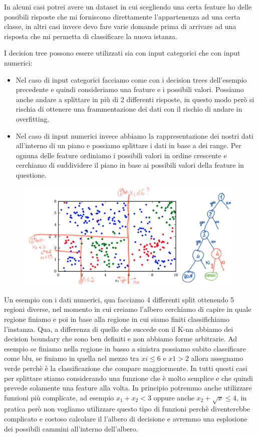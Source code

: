 \documentclass[14pt]{extreport}
\begin{document}
In alcuni casi potrei avere un dataset in cui scegliendo una certa feature ho delle possibili risposte che mi forniscono direttamente l’appartenenza
ad una certa classe, in altri casi invece devo fare varie domande prima di arrivare ad una risposta che mi permetta di classificare la nuova istanza.

I decision tree possono essere utilizzati sia con input categorici che con input numerici:

\begin{itemize}
	\item Nel caso di input categorici facciamo come con i decision trees dell’esempio precedente e quindi consideriamo una feature e i possibili
	valori. Possiamo anche andare a splittare in più di 2 differenti risposte, in questo modo però si rischia di ottenere una frammentazione dei dati
	con il rischio di andare in overfitting.
	\item Nel caso di input numerici invece abbiamo la rappresentazione dei nostri dati all’interno di un piano e possiamo splittare i dati in base a
	dei range. Per ognuna delle feature ordiniamo i possibili valori in ordine crescente e cerchiamo di suddividere il piano in base ai possibili
	valori della feature in questione.
\end{itemize}


\begin{figure}[H]
	\centering
	\includegraphics[width=0.7\linewidth]{479.jpeg}
\end{figure}

Un esempio con i dati numerici, qua facciamo 4 differenti split ottenendo 5 regioni diverse, nel momento in cui creiamo l’albero cerchiamo di capire
in quale regione finiamo e poi in base alla regione in cui siamo finiti classifichiamo l’instanza. Qua, a differenza di quello che succede con il K-nn
abbiamo dei decision boundary che sono ben definiti e non abbiamo forme arbitrarie. Ad esempio se finiamo nella regione in basso a sinistra possiamo
subito classificare come blu, se finiamo in quella nel mezzo tra $xi \leq 6$ e $x1>2$ allora assegnamo verde perchè è la classificazione che compare
maggiormente. In tutti questi casi per splittare stiamo considerando una funzione che è molto semplice e che quindi prevede solamente una feature alla
volta. In principio potremmo anche utilizzare funzioni più complicate, ad esempio $x_1+x_2 < 3$ oppure anche $x_2 +\sqrt{x} \leq 4$, in pratica però
non vogliamo utilizzare questo tipo di funzioni perchè diventerebbe complicato e costoso calcolare il l’albero di decisione e avremmo una esplosione
dei possibili cammini all’interno dell’albero.
\end{document}
